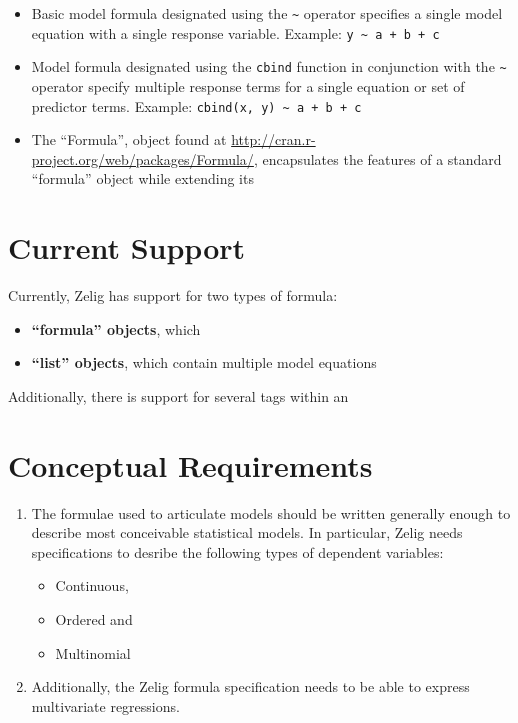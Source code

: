 \documentclass{article}
\begin{document}
\begin{itemize}

  \item Basic model formula designated using the \verb+~+ operator specifies a single
    model equation with a single response variable. Example: \verb|y ~ a + b + c|

  \item Model formula designated using the \verb+cbind+ function in conjunction
    with the \verb+~+ operator specify multiple response terms for a single
    equation or set of predictor terms. Example: \verb|cbind(x, y) ~ a + b + c|

  \item The ``Formula'', object found at
    \url{http://cran.r-project.org/web/packages/Formula/}, encapsulates the
    features of a standard ``formula'' object while extending its  

\end{itemize}









\section{Current Support}

Currently, Zelig has support for two types of formula:

\begin{itemize}
  \item {\bf ``formula'' objects}, which 
  \item {\bf ``list'' objects}, which contain multiple model equations
\end{itemize}

Additionally, there is support for several tags within an


\section{Conceptual Requirements}
\label{Conceptual-Requirements}

\begin{enumerate}

  \item The formulae used to articulate models should be written generally
    enough to describe most conceivable statistical models.
    In particular, Zelig needs specifications to desribe the following types
    of dependent variables:

    \begin{itemize}
      \item Continuous,
      \item Ordered and
      \item Multinomial
    \end{itemize}

  \item Additionally, the Zelig formula specification needs to be able to
    express multivariate regressions.

\end{enumerate}
\end{document}
